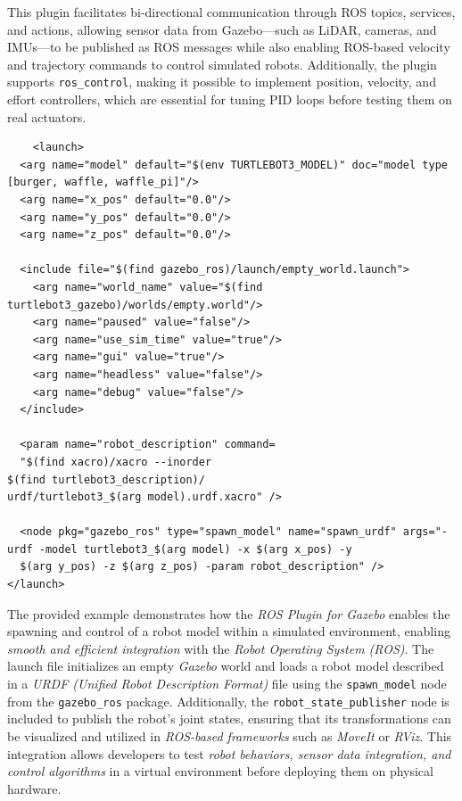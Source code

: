 \documentclass[../../main]{subfiles}
\begin{document}
This plugin facilitates bi-directional communication through ROS topics, services, and actions, allowing sensor data from Gazebo—such as LiDAR, 
cameras, and IMUs—to be published as ROS messages while also enabling ROS-based velocity and trajectory commands to control simulated robots. 
Additionally, the plugin supports \texttt{ros\_control}, making it possible to implement position, velocity, and effort controllers, 
which are essential for tuning PID loops before testing them on real actuators.
\begin{codebox}[]{}
\begin{verbatim}
    <launch>
  <arg name="model" default="$(env TURTLEBOT3_MODEL)" doc="model type [burger, waffle, waffle_pi]"/>
  <arg name="x_pos" default="0.0"/>
  <arg name="y_pos" default="0.0"/>
  <arg name="z_pos" default="0.0"/>

  <include file="$(find gazebo_ros)/launch/empty_world.launch">
    <arg name="world_name" value="$(find turtlebot3_gazebo)/worlds/empty.world"/>
    <arg name="paused" value="false"/>
    <arg name="use_sim_time" value="true"/>
    <arg name="gui" value="true"/>
    <arg name="headless" value="false"/>
    <arg name="debug" value="false"/>
  </include>

  <param name="robot_description" command=
  "$(find xacro)/xacro --inorder 
$(find turtlebot3_description)/
urdf/turtlebot3_$(arg model).urdf.xacro" />

  <node pkg="gazebo_ros" type="spawn_model" name="spawn_urdf" args="-urdf -model turtlebot3_$(arg model) -x $(arg x_pos) -y 
  $(arg y_pos) -z $(arg z_pos) -param robot_description" />
</launch>
\end{verbatim}
\end{codebox}
The provided example demonstrates how the \emph{ROS Plugin for Gazebo} enables the spawning and control of a robot model 
within a simulated environment, enabling \emph{smooth and efficient integration} with the \emph{Robot Operating System (ROS)}. 
The launch file initializes an empty \emph{Gazebo} world and loads a robot model described in a 
\emph{URDF (Unified Robot Description Format)} file using the \texttt{spawn\_model} node from the \texttt{gazebo\_ros} package. 
Additionally, the \texttt{robot\_state\_publisher} node is included to publish the robot’s joint states, 
ensuring that its transformations can be visualized and utilized in \emph{ROS-based frameworks} such as \emph{MoveIt} or \emph{RViz}. 
This integration allows developers to test \emph{robot behaviors, sensor data integration, and control algorithms} in a virtual environment 
before deploying them on physical hardware.  
\end{document}
